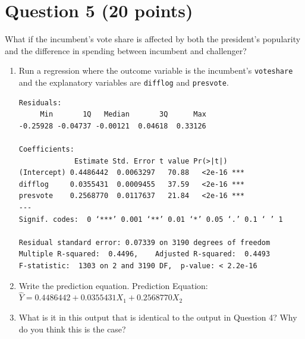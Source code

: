 \documentclass[12pt,letterpaper]{article}
\begin{document}
	\newpage	

\section*{Question 5 (20 points)}
\noindent What if the incumbent's vote share is affected by both the president's popularity and the difference in spending between incumbent and challenger? 
	\begin{enumerate}
		\item Run a regression where the outcome variable is the incumbent's \texttt{voteshare} and the explanatory variables are \texttt{difflog} and \texttt{presvote}.
		  
\begin{verbatim}
Residuals:
     Min       1Q   Median       3Q      Max 
-0.25928 -0.04737 -0.00121  0.04618  0.33126 

Coefficients:
             Estimate Std. Error t value Pr(>|t|)    
(Intercept) 0.4486442  0.0063297   70.88   <2e-16 ***
difflog     0.0355431  0.0009455   37.59   <2e-16 ***
presvote    0.2568770  0.0117637   21.84   <2e-16 ***
---
Signif. codes:  0 ‘***’ 0.001 ‘**’ 0.01 ‘*’ 0.05 ‘.’ 0.1 ‘ ’ 1

Residual standard error: 0.07339 on 3190 degrees of freedom
Multiple R-squared:  0.4496,	Adjusted R-squared:  0.4493 
F-statistic:  1303 on 2 and 3190 DF,  p-value: < 2.2e-16
\end{verbatim}
\vspace{.6cm}
		\item Write the prediction equation.			\vspace{.5cm}
		Prediction Equation: ${\hat{Y} = 0.4486442 + 0.0355431X_1 + 0.2568770X_2}$

		\item What is it in this output that is identical to the output in Question 4? Why do you think this is the case?
	

\end{enumerate}
\end{document}
